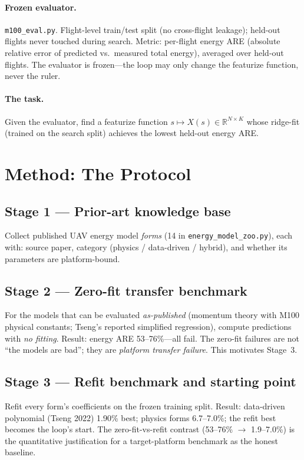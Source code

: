 \documentclass{article}
\begin{document}
\paragraph{Frozen evaluator.} \texttt{m100\_eval.py}. Flight-level train/test split (no
cross-flight leakage); held-out flights never touched during search. Metric: per-flight
energy ARE (absolute relative error of predicted vs.\ measured total energy), averaged
over held-out flights. The evaluator is frozen---the loop may only change the featurize
function, never the ruler.

\paragraph{The task.} Given the evaluator, find a featurize function
$s \mapsto X(s) \in \mathbb{R}^{N\times K}$ whose ridge-fit (trained on the search
split) achieves the lowest held-out energy ARE.

\section{Method: The Protocol}
\label{sec:method}

\subsection{Stage 1 --- Prior-art knowledge base}
\label{sec:stage1}
Collect published UAV energy model \emph{forms} (14 in \texttt{energy\_model\_zoo.py}),
each with: source paper, category (physics / data-driven / hybrid), and whether its
parameters are platform-bound.

\subsection{Stage 2 --- Zero-fit transfer benchmark}
\label{sec:stage2}
For the models that can be evaluated \emph{as-published} (momentum theory with M100
physical constants; Tseng's reported simplified regression), compute predictions with
\emph{no fitting}. Result: energy ARE 53--76\%---all fail. The zero-fit failures are not
``the models are bad''; they are \emph{platform transfer failure}. This motivates Stage~3.

\subsection{Stage 3 --- Refit benchmark and starting point}
\label{sec:stage3}
Refit every form's coefficients on the frozen training split. Result: data-driven
polynomial (Tseng 2022) 1.90\% best; physics forms 6.7--7.0\%; the refit best becomes the
loop's start. The zero-fit-vs-refit contrast (53--76\% $\rightarrow$ 1.9--7.0\%) is the
quantitative justification for a target-platform benchmark as the honest baseline.
\end{document}
